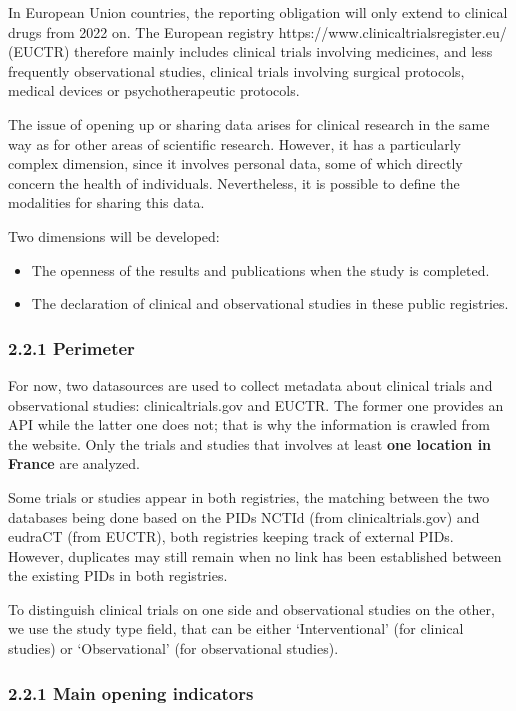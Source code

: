 \documentclass[
]{article}
\begin{document}
In European Union countries, the reporting obligation will only extend
to clinical drugs from 2022 on. The European registry
https://www.clinicaltrialsregister.eu/ (EUCTR) therefore mainly includes
clinical trials involving medicines, and less frequently observational
studies, clinical trials involving surgical protocols, medical devices
or psychotherapeutic protocols.

The issue of opening up or sharing data arises for clinical research in
the same way as for other areas of scientific research. However, it has
a particularly complex dimension, since it involves personal data, some
of which directly concern the health of individuals. Nevertheless, it is
possible to define the modalities for sharing this data.

Two dimensions will be developed:

\begin{itemize}
\item
  The openness of the results and publications when the study is
  completed.
\item
  The declaration of clinical and observational studies in these public
  registries.
\end{itemize}

\hypertarget{perimeter}{%
\subsubsection{2.2.1 Perimeter}\label{perimeter}}

For now, two datasources are used to collect metadata about clinical
trials and observational studies: clinicaltrials.gov and EUCTR. The
former one provides an API while the latter one does not; that is why
the information is crawled from the website. Only the trials and studies
that involves at least \textbf{one location in France} are analyzed.

Some trials or studies appear in both registries, the matching between
the two databases being done based on the PIDs NCTId (from
clinicaltrials.gov) and eudraCT (from EUCTR), both registries keeping
track of external PIDs. However, duplicates may still remain when no
link has been established between the existing PIDs in both registries.

To distinguish clinical trials on one side and observational studies on
the other, we use the study type field, that can be either
`Interventional' (for clinical studies) or `Observational' (for
observational studies).

\hypertarget{main-opening-indicators}{%
\subsubsection{2.2.1 Main opening
indicators}\label{main-opening-indicators}}
\end{document}

